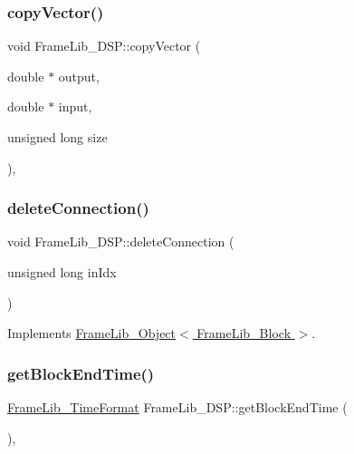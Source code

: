 \subsubsection{\texorpdfstring{copy\+Vector()}{copyVector()}}
{\footnotesize\ttfamily void Frame\+Lib\+\_\+\+D\+S\+P\+::copy\+Vector (\begin{DoxyParamCaption}\item[{double $\ast$}]{output,  }\item[{double $\ast$}]{input,  }\item[{unsigned long}]{size }\end{DoxyParamCaption})\hspace{0.3cm}{\ttfamily [inline]}, {\ttfamily [protected]}}

\mbox{\label{class_frame_lib___d_s_p_ad828d2b359466e9ff2f0f6002d580d18}} 
\subsubsection{\texorpdfstring{delete\+Connection()}{deleteConnection()}}
{\footnotesize\ttfamily void Frame\+Lib\+\_\+\+D\+S\+P\+::delete\+Connection (\begin{DoxyParamCaption}\item[{unsigned long}]{in\+Idx }\end{DoxyParamCaption})\hspace{0.3cm}{\ttfamily [virtual]}}



Implements \hyperlink{class_frame_lib___object_a4ed6892941c7b68c885b38c202f336b3}{Frame\+Lib\+\_\+\+Object$<$ Frame\+Lib\+\_\+\+Block $>$}.

\mbox{\label{class_frame_lib___d_s_p_a5f80e7fbe15189dc9c16323dcf654cbd}} 
\subsubsection{\texorpdfstring{get\+Block\+End\+Time()}{getBlockEndTime()}}
{\footnotesize\ttfamily \hyperlink{_frame_lib___types_8h_a699a4071a9eaaa283906a5ebd0a79ac0}{Frame\+Lib\+\_\+\+Time\+Format} Frame\+Lib\+\_\+\+D\+S\+P\+::get\+Block\+End\+Time (\begin{DoxyParamCaption}{ }\end{DoxyParamCaption})\hspace{0.3cm}{\ttfamily [inline]}, {\ttfamily [protected]}}

